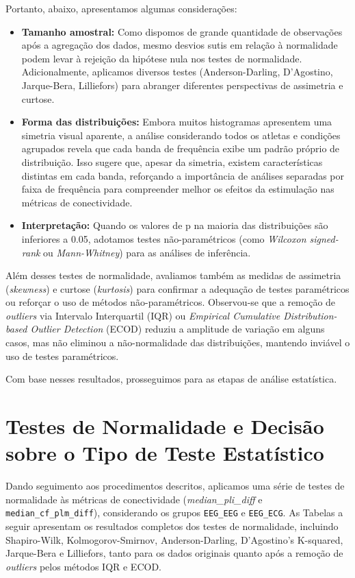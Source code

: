 Portanto, abaixo, apresentamos algumas considerações:
\begin{itemize}
    \item \textbf{Tamanho amostral:} Como dispomos de grande quantidade de observações após a agregação dos dados, mesmo desvios sutis em relação à normalidade podem levar à rejeição da hipótese nula nos testes de normalidade. 
    Adicionalmente, aplicamos diversos testes (Anderson-Darling, D'Agostino, Jarque-Bera, Lilliefors) para abranger diferentes perspectivas de assimetria e curtose.
    \item \textbf{Forma das distribuições:} Embora muitos histogramas apresentem uma simetria visual aparente, a análise considerando todos os atletas e condições agrupados revela que cada banda de frequência exibe um padrão próprio de distribuição. Isso sugere que, apesar da simetria, existem características distintas em cada banda, reforçando a importância de análises separadas por faixa de frequência para compreender melhor os efeitos da estimulação nas métricas de conectividade.
    \item \textbf{Interpretação:} Quando os valores de p na maioria das distribuições são inferiores a 0.05, adotamos testes não-paramétricos (como \textit{Wilcoxon signed-rank} ou \textit{Mann-Whitney}) para as análises de inferência.
\end{itemize}

Além desses testes de normalidade, avaliamos também as medidas de assimetria (\textit{skewness}) e curtose (\textit{kurtosis}) para confirmar a adequação de testes paramétricos ou reforçar o uso de métodos não-paramétricos. 
Observou-se que a remoção de \textit{outliers} via Intervalo Interquartil (IQR) ou \textit{Empirical Cumulative Distribution-based Outlier Detection} (ECOD) reduziu a amplitude de variação em alguns casos, mas não eliminou a não-normalidade das distribuições, mantendo inviável o uso de testes paramétricos.

Com base nesses resultados, prosseguimos para as etapas de análise estatística.

\section{Testes de Normalidade e Decisão sobre o Tipo de Teste Estatístico}
Dando seguimento aos procedimentos descritos, aplicamos uma série de testes de normalidade às métricas de conectividade (\textit{median\_pli\_diff} e \texttt{median\_cf\_plm\_diff}), considerando os grupos \texttt{EEG\_EEG} e \texttt{EEG\_ECG}. As Tabelas a seguir apresentam os resultados completos dos testes de normalidade, incluindo Shapiro-Wilk, Kolmogorov-Smirnov, Anderson-Darling, D'Agostino's K-squared, Jarque-Bera e Lilliefors, tanto para os dados originais quanto após a remoção de \textit{outliers} pelos métodos IQR e ECOD.

